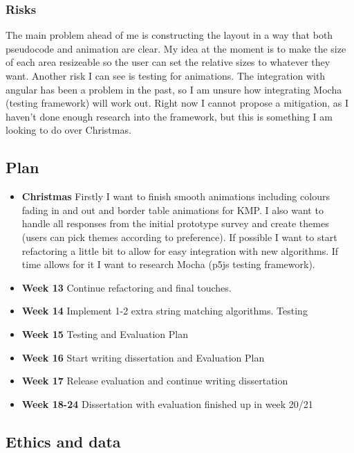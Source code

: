 \documentclass[11pt]{article}
\providecommand{\tightlist}{%
  \setlength{\itemsep}{0pt}\setlength{\parskip}{0pt}}
\begin{document}
\subsubsection{Risks}\label{risks}

The main problem ahead of me is constructing the layout in a way that both pseudocode and animation are clear. My idea at the moment is to make the size of each area resizeable so the user can set the relative sizes to whatever they want.  Another risk I can see is testing for animations. The integration with angular has been a problem in the past, so I am unsure how integrating Mocha (testing framework) will work out. Right now I cannot propose a mitigation, as I haven't done enough research into the framework, but this is something I am looking to do over Christmas.


\subsection{Plan}\label{plan}

\begin{itemize}
\tightlist
\item \textbf{Christmas} Firstly I want to finish smooth animations including colours fading in and out and border table animations for KMP. I also want to handle all responses from the initial prototype survey and create themes (users can pick themes according to preference). If possible I want to start refactoring a little bit to allow for easy integration with new algorithms. If time allows for it I want to research Mocha (p5js testing framework).
    \item \textbf{Week 13} Continue refactoring and final touches.
    \item \textbf{Week 14} Implement 1-2 extra string matching algorithms. Testing
    \item \textbf{Week 15} Testing and Evaluation Plan
    \item \textbf{Week 16} Start writing dissertation and Evaluation Plan
    \item \textbf{Week 17} Release evaluation and continue writing dissertation
    \item \textbf{Week 18-24} Dissertation with evaluation finished up in week 20/21
\end{itemize}


\subsection{Ethics and data}\label{ethics}
\end{document}
